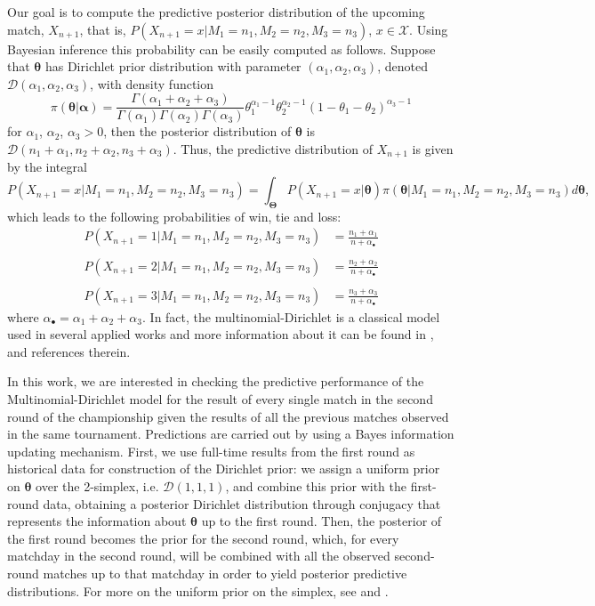 \documentclass[journal,article,accept,moreauthors,pdftex,12pt,a4paper]{mdpi}
\begin{document}
	Our goal is to compute the predictive posterior distribution of the
	upcoming match, $X_{n+1}$, that is,
	$P(X_{n+1}=x|M_1=n_1,M_2=n_2,M_3=n_3)$, $x\in\mathcal{X}$. Using
	Bayesian inference this probability can be easily computed as
	follows. Suppose that $\boldsymbol{\theta}$ has Dirichlet prior distribution
	with parameter $(\alpha_1,\alpha_2,\alpha_3)$, denoted
	$\mathcal{D}(\alpha_1,\alpha_2,\alpha_3)$, with density function
	\[
	\pi(\boldsymbol{\theta}|\boldsymbol{\alpha})=\frac{\Gamma(\alpha_1+\alpha_2+\alpha_3)}{\Gamma(\alpha_1)\Gamma(\alpha_2)\Gamma(\alpha_3)}\theta_1^{\alpha_1-1}\theta_2^{\alpha_2-1}(1-\theta_1-\theta_2)^{\alpha_3-1}
	\]
	\noindent for $\alpha_1$, $\alpha_2$, $\alpha_3 > 0$, then the
	posterior distribution of $\boldsymbol{\theta}$ is
	$\mathcal{D}(n_1+\alpha_1,n_2+\alpha_2,n_3+\alpha_3)$. Thus, the
	predictive distribution of $X_{n + 1}$ is given by the
	integral
	$$
	P(X_{n + 1} = x | M_1 = n_1, M_2 = n_2, M_3 = n_3) = \int_{\boldsymbol{\Theta}} P(X_{n
		+ 1} = x | \boldsymbol{\theta}) \pi(\boldsymbol{\theta} | M_1 = n_1, M_2 = n_2, M_3
	= n_3) d\boldsymbol{\theta},
	$$
	which leads to the following probabilities of win, tie and loss:
	\begin{align*}
	P(X_{n+1} = 1 | M_1=n_1,M_2=n_2,M_3=n_3) &=
	\frac{n_1+\alpha_1}{n+\alpha_{\bullet}}\\
	& \\
	P(X_{n+1} = 2 | M_1=n_1,M_2=n_2,M_3=n_3) &=
	\frac{n_2+\alpha_2}{n+\alpha_{\bullet}} \\
	& \\
	P(X_{n+1} = 3 | M_1=n_1, M_2=n_2, M_3=n_3) &=
	\frac{n_3+\alpha_3}{n+\alpha_{\bullet}}
	\end{align*}
	\noindent where $\alpha_{\bullet} =\alpha_1+\alpha_2+\alpha_3$.
	{\color{darkgreen} In fact, the multinomial-Dirichlet is a classical model used in several applied works and more information about it can be found in \cite{good1965}, \cite{bernardo1994} and references therein.}
	
	
	In this work, we are interested in checking the predictive performance of the Multinomial-Dirichlet
	model for the result of every single match in the second round of the championship given the results
	of all the previous matches observed in the same tournament. Predictions
	are carried out by using a Bayes information updating mechanism. First, we use full-time
	results from the first round as historical data for construction of the Dirichlet prior: we assign a uniform prior on
	$\boldsymbol{\theta}$ over the 2-simplex, i.e. $\mathcal{D}(1, 1, 1)$, and combine this prior with
	the first-round data, obtaining a posterior Dirichlet distribution through conjugacy that represents
	the information about $\boldsymbol{\theta}$ up to the first round. Then, the posterior of the first
	round becomes the prior for the second round, which, for every matchday in the second round, will be combined with all the observed second-round matches
	up to that matchday in order to yield posterior predictive distributions. {\color{darkgreen}For more on the uniform prior on the simplex, see \cite{agresti2010} and \cite{good1965}.}
\end{document}
